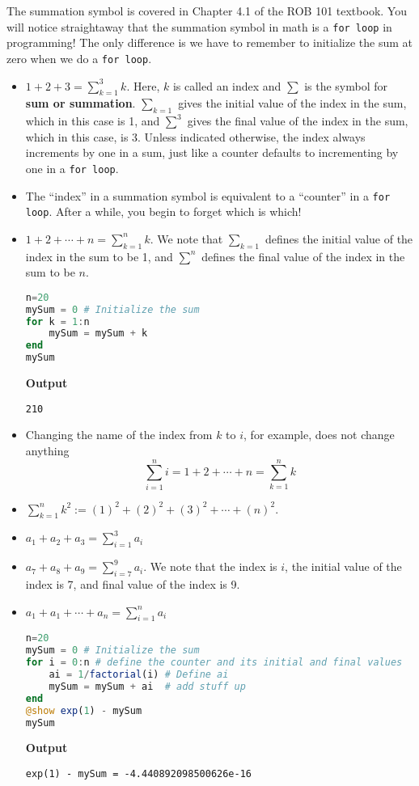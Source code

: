 The summation symbol is covered in Chapter 4.1 of the ROB 101 textbook. You will notice straightaway that the summation symbol in math is a \texttt{for\,loop} in programming! The only difference is we have to remember to initialize the sum at zero when we do a \texttt{for\,loop}. 
\begin{tcolorbox}[title=\textbf{The summation symbol is a for loop and vice versa}]

\begin{itemize}
    \item $1 + 2 + 3= \sum_{k=1}^{3} k $.  Here, $k$ is called an index and $\sum$ is the symbol for \textbf{sum or summation}. $\sum_{k=1}$ gives the initial value of the index in the sum, which in this case is 1, and  $\sum^3$ gives the final value of the index in the sum, which in this case, is 3. Unless indicated otherwise, the index always increments by one in a sum, just like a counter defaults to incrementing by one in a \texttt{for\,loop}.
    \item The ``index'' in a summation symbol is equivalent to a ``counter'' in a \texttt{for\,loop}. After a while, you begin to forget which is which! 
    \item $1 + 2 + \cdots + n = \sum_{k=1}^{n} k $. We note that $\sum_{k=1}$ defines the initial value of the index in the sum to be 1, and  $\sum^n$ defines the final value of the index in the sum to be $n$.
  \begin{lstlisting}[language=Julia,style=mystyle]
n=20
mySum = 0 # Initialize the sum
for k = 1:n 
    mySum = mySum + k
end
mySum
\end{lstlisting}
\textbf{Output} 
\begin{verbatim}
210
\end{verbatim}

    \item Changing the name of the index from $k$ to $i$, for example, does not change anything
    $$ \sum_{i=1}^{n} i =  1 + 2 + \cdots + n = \sum_{k=1}^{n} k $$
    \item $\sum_{k=1}^n k^2:= (1)^2 + (2)^2 + (3)^2 + \cdots + (n)^2.$
    \item $a_1+a_2 +a_3 =  \sum_{i=1}^{3} a_i$
    \item $a_7+a_8 +a_9 =  \sum_{i=7}^{9} a_i$. We note that the index is $i$, the initial value of the index is 7, and final value of the index is 9.
        \item $a_1+a_1 + \cdots + a_n =  \sum_{i=1}^{n} a_i$
        

\begin{lstlisting}[language=Julia,style=mystyle]
n=20
mySum = 0 # Initialize the sum
for i = 0:n # define the counter and its initial and final values
    ai = 1/factorial(i) # Define ai
    mySum = mySum + ai  # add stuff up
end
@show exp(1) - mySum
mySum
\end{lstlisting}
\textbf{Output} 
\begin{verbatim}
exp(1) - mySum = -4.440892098500626e-16


\end{verbatim}
\end{itemize}
\end{tcolorbox}
